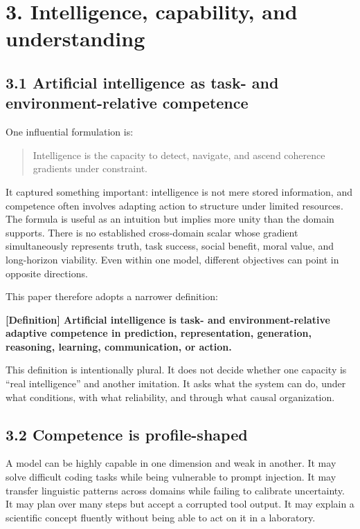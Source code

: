 \documentclass[
  11pt,
]{article}
\begin{document}
\section{3. Intelligence, capability, and
understanding}\label{intelligence-capability-and-understanding}

\subsection{3.1 Artificial intelligence as task- and
environment-relative
competence}\label{artificial-intelligence-as-task--and-environment-relative-competence}

One influential formulation is:

\begin{quote}
Intelligence is the capacity to detect, navigate, and ascend coherence
gradients under constraint.
\end{quote}

It captured something important: intelligence is not mere stored
information, and competence often involves adapting action to structure
under limited resources. The formula is useful as an intuition but
implies more unity than the domain supports. There is no established
cross-domain scalar whose gradient simultaneously represents truth, task
success, social benefit, moral value, and long-horizon viability. Even
within one model, different objectives can point in opposite directions.

This paper therefore adopts a narrower definition:

\textbf{{[}Definition{]} Artificial intelligence is task- and
environment-relative adaptive competence in prediction, representation,
generation, reasoning, learning, communication, or action.}

This definition is intentionally plural. It does not decide whether one
capacity is ``real intelligence'' and another imitation. It asks what
the system can do, under what conditions, with what reliability, and
through what causal organization.

\subsection{3.2 Competence is
profile-shaped}\label{competence-is-profile-shaped}

A model can be highly capable in one dimension and weak in another. It
may solve difficult coding tasks while being vulnerable to prompt
injection. It may transfer linguistic patterns across domains while
failing to calibrate uncertainty. It may plan over many steps but accept
a corrupted tool output. It may explain a scientific concept fluently
without being able to act on it in a laboratory.
\end{document}
